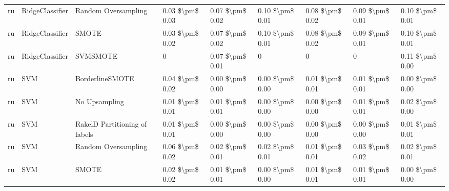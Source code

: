 \begin{tabular}{lllllllll}
      ru &                 RidgeClassifier &           Random Oversampling & 0.03 \$\textbackslash pm\$ 0.03 &           0.07 \$\textbackslash pm\$ 0.02 &       0.10 \$\textbackslash pm\$ 0.01 &        0.08 \$\textbackslash pm\$ 0.02 &                         0.09 \$\textbackslash pm\$ 0.01 &     0.10 \$\textbackslash pm\$ 0.01 \\
      ru &                 RidgeClassifier &                         SMOTE & 0.03 \$\textbackslash pm\$ 0.02 &           0.07 \$\textbackslash pm\$ 0.02 &       0.10 \$\textbackslash pm\$ 0.01 &        0.08 \$\textbackslash pm\$ 0.02 &                         0.09 \$\textbackslash pm\$ 0.01 &     0.10 \$\textbackslash pm\$ 0.01 \\
      ru &                 RidgeClassifier &                      SVMSMOTE &               0 &           0.07 \$\textbackslash pm\$ 0.01 &                     0 &                      0 &                                       0 &     0.11 \$\textbackslash pm\$ 0.00 \\
      ru &                             SVM &               BorderlineSMOTE & 0.04 \$\textbackslash pm\$ 0.02 &           0.00 \$\textbackslash pm\$ 0.00 &       0.00 \$\textbackslash pm\$ 0.00 &        0.01 \$\textbackslash pm\$ 0.01 &                         0.01 \$\textbackslash pm\$ 0.01 &     0.00 \$\textbackslash pm\$ 0.00 \\
      ru &                             SVM &                 No Upsampling & 0.01 \$\textbackslash pm\$ 0.01 &           0.01 \$\textbackslash pm\$ 0.01 &       0.00 \$\textbackslash pm\$ 0.00 &        0.00 \$\textbackslash pm\$ 0.00 &                         0.01 \$\textbackslash pm\$ 0.01 &     0.02 \$\textbackslash pm\$ 0.00 \\
      ru &                             SVM & RakelD Partitioning of labels & 0.01 \$\textbackslash pm\$ 0.01 &           0.00 \$\textbackslash pm\$ 0.00 &       0.00 \$\textbackslash pm\$ 0.00 &        0.00 \$\textbackslash pm\$ 0.00 &                         0.00 \$\textbackslash pm\$ 0.00 &     0.01 \$\textbackslash pm\$ 0.01 \\
      ru &                             SVM &           Random Oversampling & 0.06 \$\textbackslash pm\$ 0.02 &           0.02 \$\textbackslash pm\$ 0.01 &       0.02 \$\textbackslash pm\$ 0.01 &        0.01 \$\textbackslash pm\$ 0.01 &                         0.03 \$\textbackslash pm\$ 0.02 &     0.02 \$\textbackslash pm\$ 0.01 \\
      ru &                             SVM &                         SMOTE & 0.02 \$\textbackslash pm\$ 0.02 &           0.01 \$\textbackslash pm\$ 0.01 &       0.00 \$\textbackslash pm\$ 0.00 &        0.01 \$\textbackslash pm\$ 0.01 &                         0.01 \$\textbackslash pm\$ 0.01 &     0.00 \$\textbackslash pm\$ 0.00 \\

\end{tabular}
